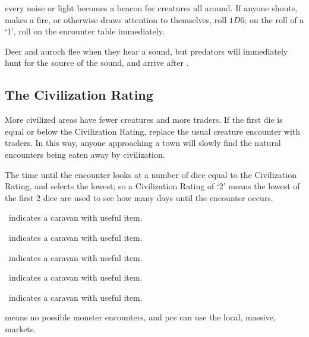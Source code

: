 \begin{multicols}{2}
every noise or light becomes a beacon for creatures all around.
If anyone shouts, makes a fire, or otherwise draws attention to themselves, roll $1D6$; on the roll of a `1', roll on the encounter table immediately.

Deer and auroch flee when they hear a sound, but predators will immediately hunt for the source of the sound, and arrive after .

\subsection{The Civilization Rating}
\label{civilizationRating}

More civilized areas have fewer creatures and more traders.
If the first die is equal or below the Civilization Rating, replace the usual creature encounter with traders.
In this way, anyone approaching a town will slowly find the natural encounters being eaten away by civilization.

The time until the encounter looks at a number of dice equal to the Civilization Rating, and selects the lowest; so a Civilization Rating of `2' means the lowest of the first 2 dice are used to see how many days until the encounter occurs.

\setcounter{encnum}{1}
\begin{dlist}
  \item
  \encCivilization\ indicates a caravan with  useful item.

  \item
  \encCivilization\ indicates a caravan with  useful item.

  \item
  \encCivilization\ indicates a caravan with  useful item.

  \item
  \encCivilization\ indicates a caravan with  useful item.

  \item
  \encCivilization\ indicates a caravan with  useful item.

  \item
  \encCivilization means no possible monster encounters, and \glspl{pc} can use the local, massive, markets.
\end{dlist}


\end{multicols}
